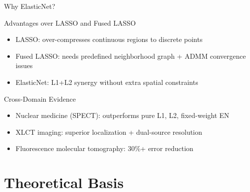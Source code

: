 \documentclass{sysupptthesis}
\begin{document}
\begin{frame}{Why ElasticNet?}
    \begin{block}{Advantages over LASSO and Fused LASSO}
        \begin{itemize}\footnotesize
            \item LASSO: over-compresses continuous regions to discrete points
            \item Fused LASSO: needs predefined neighborhood graph + ADMM convergence issues
            \item ElasticNet: L1+L2 synergy without extra spatial constraints
        \end{itemize}
    \end{block}

    \begin{block}{Cross-Domain Evidence}
        \begin{itemize}\footnotesize
            \item Nuclear medicine (SPECT): outperforms pure L1, L2, fixed-weight EN
            \item XLCT imaging: superior localization + dual-source resolution
            \item Fluorescence molecular tomography: 30\%+ error reduction
        \end{itemize}
    \end{block}

\end{frame}

\section{Theoretical Basis}
\end{document}
